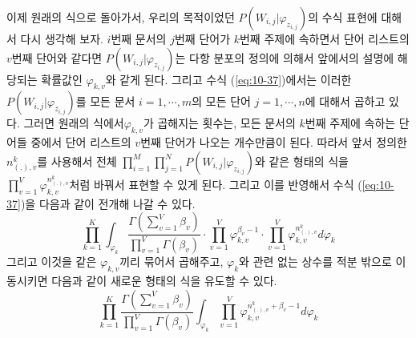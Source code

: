 \documentclass[a4paper]{oblivoir}
\begin{document}
이제 원래의 식으로 돌아가서, 우리의 목적이었던 $P(W_{i,j}|\varphi_{z_{i,j}})$의 수식 표현에 대해서 다시 생각해 보자. $i$번째 문서의 $j$번째 단어가 $k$번째 주제에 속하면서 단어 리스트의 $v$번째 단어와 같다면 $P(W_{i,j}|\varphi_{z_{i,j}})$는 다항 분포의 정의에 의해서 앞에서의 설명에 해당되는 확률값인 $\varphi_{k,v}$와 같게 된다. 그리고 수식 (\ref{eq:10-37})에서는 이러한 $P(W_{i,j}|\varphi_{z_{i,j}})$를 모든 문서 $i=1,\cdots,m$의 모든 단어 $j=1,\cdots,n$에 대해서 곱하고 있다. 그러면 원래의 식에서$\varphi_{k,v}$가 곱해지는 횟수는, 모든 문서의 $k$번째 주제에 속하는 단어들 중에서 단어 리스트의 $v$번째 단어가 나오는 개수만큼이 된다. 따라서 앞서 정의한 $n_{(.),v}^{k}$를 사용해서 전체 $\prod_{i=1}^{M} \prod_{j=1}^{N} P(W_{i,j}|\varphi_{z_{i,j}})$와 같은 형태의 식을 $\prod_{v=1}^{V} \varphi_{k,v}^{n_{(.),v}^{k}}$처럼 바꿔서 표현할 수 있게 된다. 그리고 이를 반영해서 수식 (\ref{eq:10-37})을 다음과 같이 전개해 나갈 수 있다. 
\begin{equation}
\prod_{k=1}^{K} \int_{\varphi_{k}} \frac{\Gamma(\sum_{v=1}^{V} \beta_{v})}{\prod_{v=1}^{V} \Gamma(\beta_{v})} \cdot \prod_{v=1}^{V} \varphi_{k,v}^{\beta_{v}-1} \cdot \prod_{v=1}^{V} \varphi_{k,v}^{n_{(.),v}^{k}} d\varphi_{k}
\label{eq:10-38}
\end{equation}
그리고 이것을 같은 $\varphi_{k,v}$끼리 묶어서 곱해주고, $\varphi_{k}$와 관련 없는 상수를 적분 밖으로 이동시키면 다음과 같이 새로운 형태의 식을 유도할 수 있다. 
\begin{equation}
\prod_{k=1}^{K} \frac{\Gamma(\sum_{v=1}^{V} \beta_{v})}{\prod_{v=1}^{V} \Gamma(\beta_{v})} \int_{\varphi_{k}} \prod_{v=1}^{V} \varphi_{k,v}^{n_{(.),v}^{k}+\beta_{v}-1} d\varphi_{k}
\label{eq:10-39}
\end{equation} 
\end{document}
